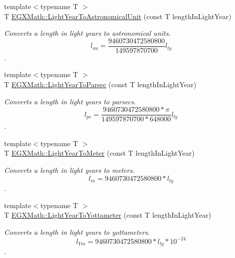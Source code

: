\begin{DoxyCompactItemize}
\item 
{\footnotesize template$<$typename T $>$ }\\T \mbox{\hyperlink{group___e_g_x_math-_conversions-_length_conversions-_astronomical-_light_year-_astronomical_ga7e08f2da47a7b84833be76f30fe3840f}{E\+G\+X\+Math\+::\+Light\+Year\+To\+Astronomical\+Unit}} (const T length\+In\+Light\+Year)
\begin{DoxyCompactList}\small\item\em Converts a length in light years to astronomical units. \[ l_{au}= \frac{9460730472580800}{149597870700} l_{ly} \]. \end{DoxyCompactList}\item 
{\footnotesize template$<$typename T $>$ }\\T \mbox{\hyperlink{group___e_g_x_math-_conversions-_length_conversions-_astronomical-_light_year-_astronomical_ga7fbe95808f04d03719e53d868b0cac45}{E\+G\+X\+Math\+::\+Light\+Year\+To\+Parsec}} (const T length\+In\+Light\+Year)
\begin{DoxyCompactList}\small\item\em Converts a length in light years to parsecs. \[ l_{pc}=\frac{9460730472580800 * \pi}{149597870700 * 648000} l_{ly} \]. \end{DoxyCompactList}\item 
{\footnotesize template$<$typename T $>$ }\\T \mbox{\hyperlink{group___e_g_x_math-_conversions-_length_conversions-_astronomical-_light_year-_s_i_ga5475c14ecdd1c3379e891342591cc8e2}{E\+G\+X\+Math\+::\+Light\+Year\+To\+Meter}} (const T length\+In\+Light\+Year)
\begin{DoxyCompactList}\small\item\em Converts a length in light years to meters. \[ l_{m}=9460730472580800 * l_{ly} \]. \end{DoxyCompactList}\item 
{\footnotesize template$<$typename T $>$ }\\T \mbox{\hyperlink{group___e_g_x_math-_conversions-_length_conversions-_astronomical-_light_year-_s_i_ga2b65212eca253e0742a29d3d5f4d7a27}{E\+G\+X\+Math\+::\+Light\+Year\+To\+Yottameter}} (const T length\+In\+Light\+Year)
\begin{DoxyCompactList}\small\item\em Converts a length in light years to yottameters. \[ l_{Ym}=9460730472580800 * l_{ly} * 10^{-24} \]. \end{DoxyCompactList}\item 

\end{DoxyCompactItemize}
